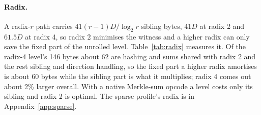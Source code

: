 \paragraph{Radix.} A radix-$r$ path carries $41(r-1)D/\log_2 r$ sibling
bytes, $41D$ at radix 2 and $61.5D$ at radix 4, so radix 2 minimises the
witness and a higher radix can only save the fixed part of the unrolled
level. Table~\ref{tab:radix} measures it. Of the radix-4 level's 146 bytes about 62
are hashing and sums shared with radix 2 and the rest sibling and
direction handling, so the fixed part a higher radix amortises is about
60 bytes while the sibling part is what it multiplies; radix 4 comes out
about 2\% larger overall. With a native Merkle-sum opcode a
level costs only its sibling and radix 2 is optimal. The sparse profile's
radix is in Appendix~\ref{app:sparse}.
